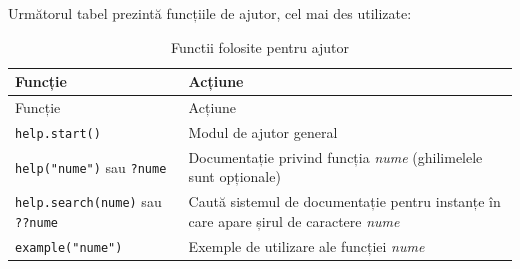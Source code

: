 \documentclass[]{article}
\begin{document}
Următorul tabel prezintă funcțiile de ajutor, cel mai des utilizate:

\begin{longtable}[]{@{}ll@{}}
\caption{Functii folosite pentru ajutor}\tabularnewline
\toprule
\begin{minipage}[b]{0.27\columnwidth}\raggedright\strut
Funcție\strut
\end{minipage} & \begin{minipage}[b]{0.34\columnwidth}\raggedright\strut
Acțiune\strut
\end{minipage}\tabularnewline
\midrule
\endfirsthead
\toprule
\begin{minipage}[b]{0.27\columnwidth}\raggedright\strut
Funcție\strut
\end{minipage} & \begin{minipage}[b]{0.34\columnwidth}\raggedright\strut
Acțiune\strut
\end{minipage}\tabularnewline
\midrule
\endhead
\begin{minipage}[t]{0.27\columnwidth}\raggedright\strut
\texttt{help.start()}\strut
\end{minipage} & \begin{minipage}[t]{0.34\columnwidth}\raggedright\strut
Modul de ajutor general\strut
\end{minipage}\tabularnewline
\begin{minipage}[t]{0.27\columnwidth}\raggedright\strut
\texttt{help("nume")} sau \texttt{?nume}\strut
\end{minipage} & \begin{minipage}[t]{0.34\columnwidth}\raggedright\strut
Documentație privind funcția \emph{nume} (ghilimelele sunt
opționale)\strut
\end{minipage}\tabularnewline
\begin{minipage}[t]{0.27\columnwidth}\raggedright\strut
\texttt{help.search(nume)} sau \texttt{??nume}\strut
\end{minipage} & \begin{minipage}[t]{0.34\columnwidth}\raggedright\strut
Caută sistemul de documentație pentru instanțe în care apare șirul de
caractere \emph{nume}\strut
\end{minipage}\tabularnewline
\begin{minipage}[t]{0.27\columnwidth}\raggedright\strut
\texttt{example("nume")}\strut
\end{minipage} & \begin{minipage}[t]{0.34\columnwidth}\raggedright\strut
Exemple de utilizare ale funcției \emph{nume}\strut

\end{minipage}
\end{longtable}
\end{document}
